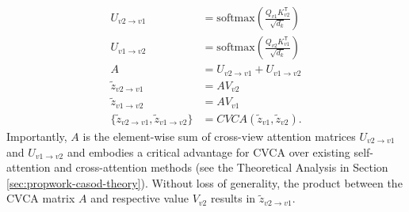 \begin{equation}
\begin{split}
	U_{v2 \rightarrow v1} & = \text{softmax} \left( \frac{Q_{v1} K_{v2}^{\mathsf{T}}}{\sqrt{d_{k}}} \right) \\
	U_{v1 \rightarrow v2} & = \text{softmax} \left( \frac{Q_{v2} K_{v1}^{\mathsf{T}}}{\sqrt{d_{k}}} \right) \\
	A & = U_{v2 \rightarrow v1} + U_{v1 \rightarrow v2} \\
	\tilde{z}_{v2 \rightarrow v1} & =  A V_{v2} \\
	\tilde{z}_{v1 \rightarrow v2} & =  A V_{v1} \\
	\{\tilde{z}_{v2 \rightarrow v1}, \tilde{z}_{v1 \rightarrow v2}\} & = CVCA(\tilde{z}_{v1}, \tilde{z}_{v2}).
\end{split}
\end{equation}
Importantly, $A$ is the element-wise sum of cross-view attention matrices $U_{v2 \rightarrow v1}$ and $U_{v1 \rightarrow v2}$ and embodies a critical advantage for CVCA over existing self-attention and cross-attention methods (see the Theoretical Analysis in Section \ref{sec:propwork-casod-theory}). Without loss of generality, the product between the CVCA matrix $A$ and respective value $V_{v2}$ results in $\tilde{z}_{v2 \rightarrow v1}$. 

